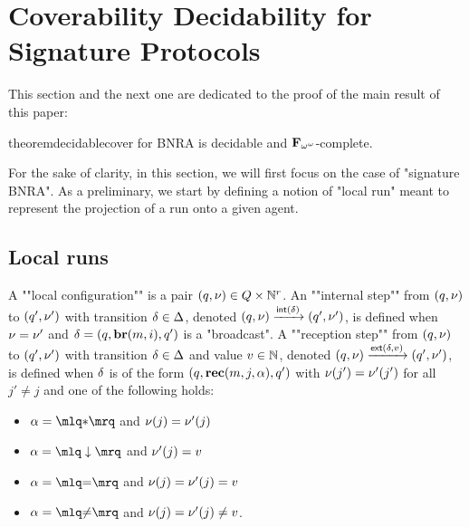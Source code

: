 \section{Coverability Decidability for Signature Protocols}
\label{sec:cover-decidability}

This section and the next one are dedicated to the proof of the main result of this paper:

\begin{restatable}{theorem}{decidablecover}
\label{thm:decidable-cover}
\COVER for BNRA is decidable and $\mathbf{F}_{\omega^\omega}$-complete.
\end{restatable}

For the sake of clarity, in this section, we will first focus on the case of "signature BNRA". 
As a preliminary, we start by defining a notion of "local run" meant to represent the projection of a run onto a given agent.

\subsection{Local runs}
\AP A ""local configuration"" is a pair $(q, \nu) \in Q \times \mathbb{N}^r$.  
\AP An ""internal step"" from $(q,\nu)$ to $(q',\nu')$ with transition $\delta \in \Delta$, denoted $(q,\nu) \xrightarrow{\mathsf{int}(\delta)} (q',\nu')$, is defined when $\nu = \nu'$ and $\delta =(q, \textbf{br}(m, i), q')$ is a "broadcast".  
\AP A ""reception step"" from $(q,\nu)$ to $(q',\nu')$ with transition $\delta \in \Delta$ and value $v \in \mathbb{N}$, denoted $(q,\nu) \xrightarrow{\mathsf{ext}(\delta,v)} (q',\nu')$, is defined when $\delta$ is of the form $(q,\textbf{rec}(m, j, \alpha),q')$ with $\nu(j') = \nu'(j')$ for all $j' \neq j$ and one of the following holds:
	
	\begin{minipage}[t]{6cm}
		\begin{itemize}
			\item $\anact = \quotemarks{\dummyact}$ 
			and $\nu(j) = \nu'(j)$
			\item $\anact = \quotemarks{\enregact}$ and $\nu'(j) = v$
		\end{itemize}
	\end{minipage}
	\begin{minipage}[t]{6cm}
		\begin{itemize}
			\item $\anact = \quotemarks{\eqtestact}$ and $\nu(j) = \nu'(j)= v$
			\item $\anact = \quotemarks{\diseqtestact}$ and $\nu(j) = \nu'(j) \ne v$.
		\end{itemize}
	\end{minipage}
	

